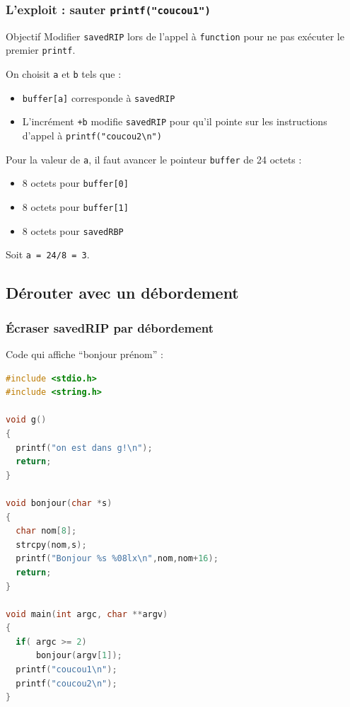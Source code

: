 \documentclass{beamer}
\begin{document}
\begin{frame}[fragile]
\frametitle{L'exploit : sauter \texttt{printf("coucou1")}}

\begin{block}{Objectif}
Modifier \texttt{savedRIP} lors de l'appel à \texttt{function} pour ne pas exécuter le premier \texttt{printf}.
\end{block}

On choisit \texttt{a} et \texttt{b} tels que :
\begin{itemize}
\item \texttt{buffer[a]} corresponde à \texttt{savedRIP}
\item L'incrément \texttt{+b} modifie \texttt{savedRIP} pour qu'il pointe sur les instructions d'appel à \texttt{printf("coucou2\textbackslash n")}
\end{itemize}

\medskip
Pour la valeur de \texttt{a}, il faut avancer le pointeur \texttt{buffer} de 24 octets :
\begin{itemize}
\item 8 octets pour \texttt{buffer[0]}
\item 8 octets pour \texttt{buffer[1]}
\item 8 octets pour \texttt{savedRBP}
\end{itemize}
Soit \texttt{a = 24/8 = 3}.

\end{frame}


\subsection{Dérouter avec un débordement}

\begin{frame}[fragile]
\frametitle{Écraser savedRIP par débordement}

Code qui affiche ``bonjour prénom'' :

\begin{lstlisting}[language=C]
#include <stdio.h>
#include <string.h>

void g()
{
  printf("on est dans g!\n");
  return;
}

void bonjour(char *s)
{
  char nom[8];
  strcpy(nom,s);
  printf("Bonjour %s %08lx\n",nom,nom+16);
  return;
}

void main(int argc, char **argv)
{
  if( argc >= 2)
      bonjour(argv[1]);
  printf("coucou1\n");
  printf("coucou2\n");
}
\end{lstlisting}

\end{frame}
\end{document}
